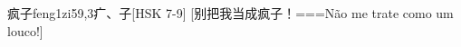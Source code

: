 \begin{EntryWithPhonetic}{疯子}{feng1zi5}{9,3}{⽧、⼦}[HSK 7-9]
  [别把我当成疯子！===Não me trate como um louco!]
\end{EntryWithPhonetic}
